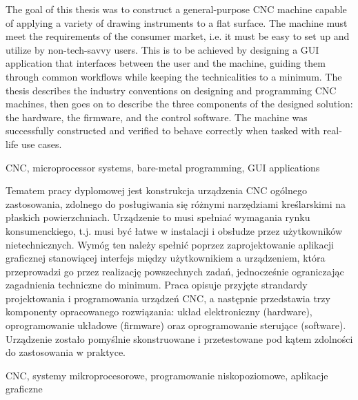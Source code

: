 \abstract
The goal of this thesis was to construct a general-purpose CNC machine capable
of applying a variety of drawing instruments to a flat surface. The machine
must meet the requirements of the consumer market, i.e. it must be easy to set
up and utilize by non-tech-savvy users. This is to be achieved by designing a
GUI application that interfaces between the user and the machine, guiding them
through common workflows while keeping the technicalities to a minimum. The
thesis describes the industry conventions on designing and programming CNC
machines, then goes on to describe the three components of the designed
solution: the hardware, the firmware, and the control software. The machine
was successfully constructed and verified to behave correctly when tasked with
real-life use cases.

\keywords CNC, microprocessor systems, bare-metal programming, GUI applications

\bigskip
\secondabstract
Tematem pracy dyplomowej jest konstrukcja urządzenia CNC ogólnego zastosowania,
zdolnego do posługiwania się różnymi narzędziami kreślarskimi na płaskich
powierzchniach. Urządzenie to musi spełniać wymagania rynku konsumenckiego, t.j.
musi być łatwe w instalacji i obsłudze przez użytkowników nietechnicznych.
Wymóg ten należy spełnić poprzez zaprojektowanie aplikacji graficznej
stanowiącej interfejs między użytkownikiem a urządzeniem, która przeprowadzi go
przez realizację powszechnych zadań, jednocześnie ograniczając zagadnienia
techniczne do minimum. Praca opisuje przyjęte strandardy projektowania i
programowania urządzeń CNC, a następnie przedstawia trzy komponenty opracowanego
rozwiązania: układ elektroniczny (hardware), oprogramowanie układowe (firmware)
oraz oprogramowanie sterujące (software). Urządzenie zostało pomyślnie
skonstruowane i przetestowane pod kątem zdolności do zastosowania w praktyce.

\secondkeywords CNC, systemy mikroprocesorowe, programowanie niskopoziomowe, aplikacje
graficzne
